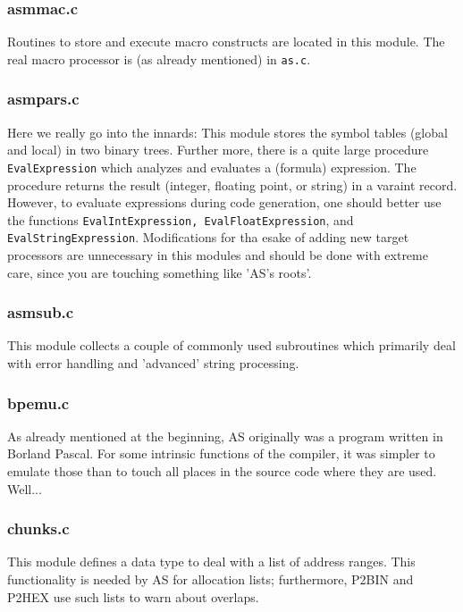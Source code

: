 \documentclass[12pt,twoside]{report}
\newcommand{\tty}[1]{{\tt #1}}
\begin{document}
\subsubsection{asmmac.c}

Routines to store and execute macro constructs are located in this module. 
The real macro processor is (as already mentioned) in {\tt as.c}.

\subsubsection{asmpars.c}

Here we really go into the innards: This module stores the symbol tables
(global and local) in two binary trees.  Further more, there is a quite
large procedure {\tt EvalExpression} which analyzes and evaluates a (formula)
expression.  The procedure returns the result (integer, floating point, or
string) in a varaint record.  However, to evaluate expressions during code
generation, one should better use the functions  \tty{EvalIntExpression,
EvalFloatExpression}, and \tty{EvalStringExpression}.  Modifications for
tha esake of adding new target processors are unnecessary in this modules
and should be done with extreme care, since you are touching something
like 'AS's roots'.

\subsubsection{asmsub.c}

This module collects a couple of commonly used subroutines which primarily
deal with error handling and 'advanced' string processing.

\subsubsection{bpemu.c}

As already mentioned at the beginning, AS originally was a program written
in Borland Pascal.  For some intrinsic functions of the compiler, it was
simpler to emulate those than to touch all places in the source code where
they are used.  Well...

\subsubsection{chunks.c}

This module defines a data type to deal with a list of address ranges. 
This functionality is needed by AS for allocation lists; furthermore,
P2BIN and P2HEX use such lists to warn about overlaps.
\end{document}
